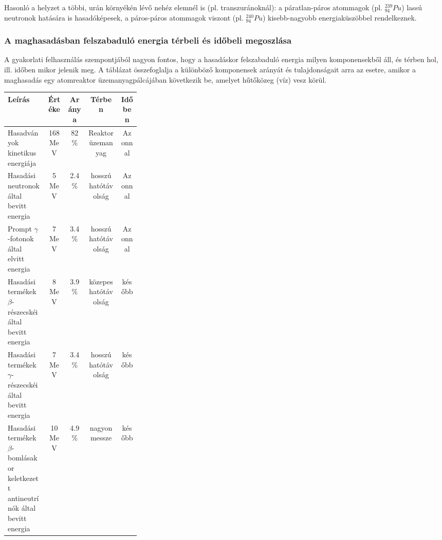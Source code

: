 \documentclass[../main.tex]{subfiles}
\begin{document}
Hasonló a helyzet a többi, urán környékén lévő nehéz elemnél is (pl. transzuránoknál):
a páratlan-páros atommagok (pl. $^{239}_{94}Pu$) lassú neutronok hatására is hasadóképesek, a
páros-páros atommagok viszont (pl. $^{240}_{94}Pu$) kisebb-nagyobb energiaküszöbbel rendelkeznek.

\subsubsection*{A maghasadásban felszabaduló energia térbeli és időbeli megoszlása}
A gyakorlati felhasználás szempontjából nagyon fontos, hogy a hasadáskor felszabaduló
energia milyen komponensekből áll, és térben hol, ill. időben mikor jelenik meg. A
táblázat összefoglalja a különböző komponensek arányát és tulajdonságait arra az esetre,
amikor a maghasadás egy atomreaktor üzemanyagpálcájában következik be, amelyet
hűtőközeg (víz) vesz körül.
\begin{table}[H]
    \centering
    \begin{tabular}{|p{0.30\linewidth}|c|c|c|c|}
        \hline
        Leírás & Értéke & Aránya & Térben & Időben \\
        \hline
        Hasadványok kinetikus energiája & 168 MeV & 82\% & Reaktor üzemanyag & Azonnal \\
        \hline
        Hasadási neutronok által bevitt energia & 5 MeV & 2.4\% & hosszú hatótávolság & Azonnal \\
        \hline
        Prompt $\gamma$-fotonok által elvitt energia & 7 MeV & 3.4\% & hosszú hatótávolság & Azonnal \\
        \hline
        Hasadási termékek $\beta$-részecskéi által bevitt energia & 8 MeV & 3.9\% & közepes hatótávolság & később \\
        \hline
        Hasadási termékek $\gamma$-részecskéi által bevitt energia & 7 MeV & 3.4\% & hosszú hatótávolság & később \\
        \hline
        Hasadási termékek $\beta$-bomlásakor keletkezett antineutrínók által bevitt energia & 10 MeV & 4.9\% & nagyon messze & később \\
        \hline
    \end{tabular}
\end{table}
\end{document}
